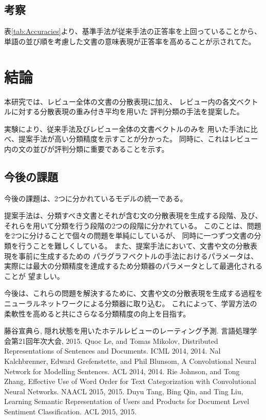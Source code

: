 \documentclass[twocolumn,a4paper]{ltjarticle}
\begin{document}
\subsection{考察}

表\ref{tab:Accuracies}より、基準手法が従来手法の正答率を上回っていることから、
単語の並び順を考慮した文書の意味表現が正答率を高めることが示されてた。




\section{結論}

本研究では、レビュー全体の文書の分散表現に加え、
レビュー内の各文ベクトルに対する分散表現の重み付き平均を用いた
評判分類の手法を提案した。

実験により、従来手法\cite{fujitani15}及びレビュー全体の文書ベクトルのみを
用いた手法に比べ、提案手法が高い分類精度を示すことが分かった。
同時に、これはレビュー内の文の並びが評判分類に重要であることを示す。



\subsection{今後の課題}

今後の課題は、2つに分かれているモデルの統一である。

提案手法は、分類すべき文書とそれが含む文の分散表現を生成する段階、及び、
それらを用いて分類を行う段階の2つの段階に分かれている。
このことは、問題を2つに分けることで個々の問題を単純にしているが、
同時に一つずつ文書の分類を行うことを難しくしている。
また、提案手法において、文書や文の分散表現を事前に生成するための
パラグラフベクトルの手法におけるパラメータは、
実際には最大の分類精度を達成するため分類器のパラメータとして最適化されることが
望ましい。

今後は、これらの問題を解決するために、文書や文の分散表現を生成する過程を
ニューラルネットワークによる分類器に取り込む。
これによって、学習方法の柔軟性を高めると共にさらなる分類精度の向上を目指す。





\begin{thebibliography}{9}
  藤谷宣典ら,
  隠れ状態を用いたホテルレビューのレーティング予測.
  言語処理学会第21回年次大会, 2015.
  Quoc Le, and Tomas Mikolov,
  Distributed Representations of Sentences and Documents.
  ICML 2014, 2014.
  Nal Kalchbrenner, Edward Grefenstette, and Phil Blunsom,
  A Convolutional Neural Network for Modelling Sentences.
  ACL 2014, 2014.
  Rie Johnson, and Tong Zhang,
  Effective Use of Word Order for Text Categorization
  with Convolutional Neural Networks.
  NAACL 2015, 2015.
  Duyu Tang, Bing Qin, and Ting Liu,
  Learning Semantic Representation of Users and Products
  for Document Level Sentiment Classification.
  ACL 2015, 2015.
\end{thebibliography}
\end{document}
